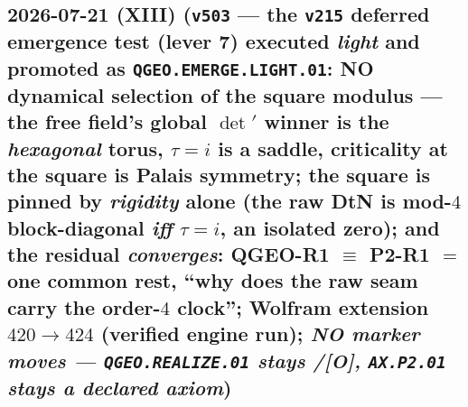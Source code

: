 \documentclass[11pt]{article}
\providecommand{\mO}{\textbf{[O]}}\providecommand{\mX}{\textbf{[X]}}
\begin{document}
\subsection*{2026-07-21 (XIII) (\texttt{v503} --- the \texttt{v215} deferred emergence test (lever 7) executed \emph{light} and promoted as \texttt{QGEO.EMERGE.LIGHT.01}: NO dynamical selection of the square modulus --- the free field's global $\det{}'$ winner is the \emph{hexagonal} torus, $\tau{=}i$ is a saddle, criticality at the square is Palais symmetry; the square is pinned by \emph{rigidity} alone (the raw DtN is mod-$4$ block-diagonal \emph{iff} $\tau{=}i$, an isolated zero); and the residual \emph{converges}: QGEO-R1 $\equiv$ P2-R1 $=$ one common rest, ``why does the raw seam carry the order-$4$ clock''; Wolfram extension $420\to424$ (verified engine run); \emph{NO marker moves --- \texttt{QGEO.REALIZE.01} stays \mC/\mO, \texttt{AX.P2.01} stays a declared axiom})}
\end{document}
